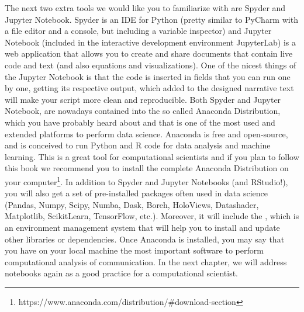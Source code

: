 The next two extra tools we would like you to familiarize with are
Spyder and Jupyter Notebook. Spyder is an IDE for Python (pretty
similar to PyCharm with a file editor and a console, but including a
variable inspector) and Jupyter Notebook (included in the interactive
development environment JupyterLab) is a web application that allows
you to create and share documents that contain live code and text (and
also equations and visualizations).  One of the nicest things of the
Jupyter Notebook is that the code is inserted in fields that you can
run one by one, getting its respective output, which added to the
designed narrative text will make your script more clean and
reproducible. Both Spyder and Jupyter Notebook, are nowadays
contained into the so called Anaconda Distribution, which you have
probably heard about and that is one of the most used and extended
platforms to perform data science. Anaconda is free and open-source,
and is conceived to run Python and R code for data analysis and
machine learning. This is a great tool for computational scientists
and if you plan to follow this book we recommend you to install the
complete Anaconda Distribution on your
computer\footnote{https://www.anaconda.com/distribution/\#download-section}. In
addition to Spyder and Jupyter Notebooks (and RStudio!), you will also
get a set of pre-installed packages often used in data science
(Pandas, Numpy, Scipy, Numba, Dask, Boreh, HoloViews, Datashader,
Matplotlib, ScikitLearn, TensorFlow, etc.). Moreover, it will include
the , which is an environment management system
that will help you to install and update other libraries or
dependencies. Once Anaconda is installed, you may say that you have on
your local machine the most important software to perform
computational analysis of communication. In the next chapter, we will
address notebooks again as a good practice for a computational
scientist.
